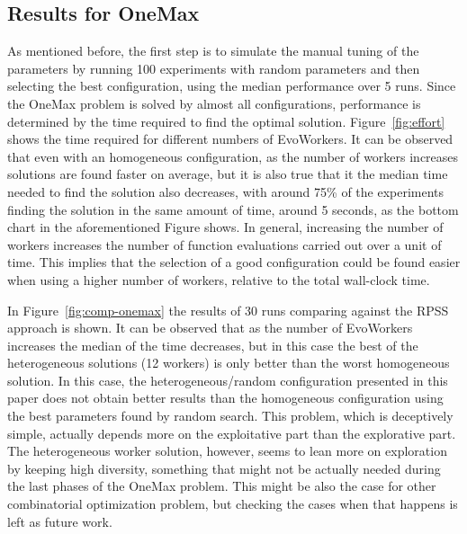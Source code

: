 \documentclass[conference]{IEEEtran}
\begin{document}
\subsection{Results for OneMax}

As mentioned before, the first step is to simulate the manual tuning of the parameters
by running 100 experiments with random parameters and then selecting the best configuration,
using the median performance over 5 runs. Since the OneMax problem is solved by almost all
configurations, performance is determined by the time required to find the optimal solution.
Figure~\ref{fig:effort} shows the time required for different numbers of EvoWorkers.
It can be observed that even with an homogeneous configuration, as the number of workers
increases solutions are found faster on average, but it is also true
that it the median time needed to find the solution also decreases,
with around 75\% of the experiments finding the solution in the same
amount of time, around 5 seconds, as the bottom chart in the
aforementioned Figure shows.  In general, increasing the number of workers increases
the number of function evaluations carried out over a unit of time. This implies that the selection
of a good configuration could be found easier when using a higher number of workers, relative
to the total wall-clock time.

In Figure~\ref{fig:comp-onemax} the results of 30 runs comparing against the RPSS approach is shown.
It can be observed that as the number of EvoWorkers increases the median of the time decreases, but
in this case the best of the heterogeneous solutions (12 workers) is only better than the worst homogeneous
solution. In this case, the heterogeneous/random configuration
presented in this paper does not obtain better results than the
homogeneous configuration using the best parameters found by random
search. This problem, which is deceptively simple, actually depends
more on the exploitative part than the explorative part. The
heterogeneous worker solution, however, seems to lean more on
exploration by keeping high diversity, something that might not be
actually needed during the last phases of the OneMax problem. This
might be also the case for other combinatorial optimization problem,
but checking the cases when that happens is left as future work.
\end{document}
